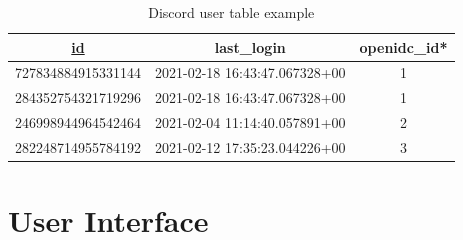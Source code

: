 \begin{table}[H]
	\centering
	\small
	\setlength\tabcolsep{2pt}
	\begin{tabular}{|c|c|c|}
		\hline
		\underline{id}                 & last\_login                   & openidc\_id* \\
		\hline
		727834884915331144 & 2021-02-18 16:43:47.067328+00 & 1           \\
		284352754321719296 & 2021-02-18 16:43:47.067328+00 & 1           \\
		246998944964542464 & 2021-02-04 11:14:40.057891+00 & 2           \\
		282248714955784192 & 2021-02-12 17:35:23.044226+00 & 3           \\
		\hline
	\end{tabular}
	\caption{Discord user table example}
	\label{tab:dis-table}
\end{table}

\section{User Interface}

